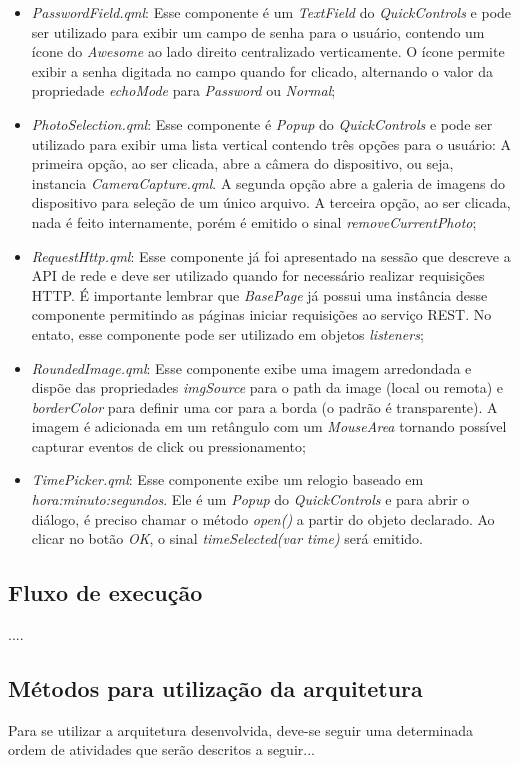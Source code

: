 \begin{itemize}
	\item \textit{PasswordField.qml}: Esse componente é um \textit{TextField} do \textit{QuickControls} e pode ser utilizado para exibir um campo de senha para o usuário, contendo um ícone do \textit{Awesome} ao lado direito centralizado verticamente. O ícone permite exibir a senha digitada no campo quando for clicado, alternando o valor da propriedade \textit{echoMode} para \textit{Password} ou \textit{Normal};

	\item \textit{PhotoSelection.qml}: Esse componente é \textit{Popup} do \textit{QuickControls} e pode ser utilizado para exibir uma lista vertical contendo três opções para o usuário: A primeira opção, ao ser clicada, abre a câmera do dispositivo, ou seja, instancia \textit{CameraCapture.qml}. A segunda opção abre a galeria de imagens do dispositivo para seleção de um único arquivo. A terceira opção, ao ser clicada, nada é feito internamente, porém é emitido o sinal \textit{removeCurrentPhoto};

	\item \textit{RequestHttp.qml}: Esse componente já foi apresentado na sessão que descreve a API de rede e deve ser utilizado quando for necessário realizar requisições HTTP. É importante lembrar que \textit{BasePage} já possui uma instância desse componente permitindo as páginas iniciar requisições ao serviço REST. No entato, esse componente pode ser utilizado em objetos \textit{listeners};

	\item \textit{RoundedImage.qml}: Esse componente exibe uma imagem arredondada e dispõe das propriedades \textit{imgSource} para o path da image (local ou remota) e \textit{borderColor} para definir uma cor para a borda (o padrão é transparente). A imagem é adicionada em um retângulo com um \textit{MouseArea} tornando possível capturar eventos de click ou pressionamento;

	\item \textit{TimePicker.qml}: Esse componente exibe um relogio baseado em \textit{hora:minuto:segundos}. Ele é um \textit{Popup} do \textit{QuickControls} e para abrir o diálogo, é preciso chamar o método \textit{open()} a partir do objeto declarado. Ao clicar no botão \textit{OK}, o sinal \textit{timeSelected(var time)} será emitido.
\end{itemize}


\subsection{Fluxo de execução}\label{sec:solucao-desenvolvida}
....


\subsection{Métodos para utilização da arquitetura}
Para se utilizar a arquitetura desenvolvida, deve-se seguir uma determinada ordem de atividades que serão descritos a seguir...
